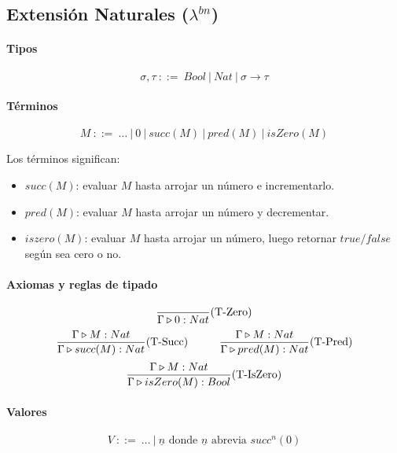\subsection{Extensión Naturales (\texorpdfstring{$\lambda^{bn}$}{lambda bn})}

\paragraph{Tipos}
$$\sigma, \tau ~::=~ Bool~|~Nat~|~\sigma\to\tau$$

\paragraph{Términos}
$$ M~::=~ \dots~|~0~|~succ(M)~|~pred(M)~|~isZero(M) $$

Los términos significan:
\begin{itemize}
	\item $succ(M)$: evaluar $M$ hasta arrojar un número e incrementarlo.
	\item $pred(M)$: evaluar $M$ hasta arrojar un número y decrementar.
	\item $iszero(M)$: evaluar $M$ hasta arrojar un número, luego retornar $true/false$ según sea cero o no.
\end{itemize}

\paragraph{Axiomas y reglas de tipado}
\begin{equation*}
	\frac{}{\Gamma\triangleright 0 : Nat}(\text{T-Zero})
\end{equation*}
\vspace*{5mm}
\begin{equation*}
	\frac{\Gamma\triangleright M : Nat}
	{\Gamma\triangleright succ(M) : Nat}(\text{T-Succ})\hspace*{1cm}
	\frac{\Gamma\triangleright M : Nat}{\Gamma\triangleright pred(M) : Nat}(\text{T-Pred})
\end{equation*}
\vspace*{5mm}
\begin{equation*}
	\frac{\Gamma\triangleright M : Nat}{\Gamma\triangleright isZero(M) : Bool}(\text{T-IsZero})
\end{equation*}

\paragraph{Valores}
$$V~::=~\dots~|~\underline{n}\text{ donde } \underline{n} \text{ abrevia } succ^n(0)$$

